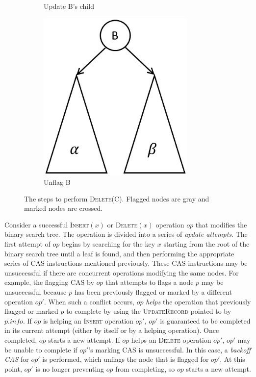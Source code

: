 \documentclass[letterpaper]{article}
\newcommand{\info}{\mathit{info}}
\begin{document}
\begin{figure}[!bt]
\begin{subfigure}[b]{0.2\textwidth}
		\caption{Update B's child}
	\end{subfigure}
	\qquad
	\begin{subfigure}[b]{0.2\textwidth}\centering
		\includegraphics[width=0.85\textwidth]{bst_del_5.png} 
		\caption{Unflag B}
	\end{subfigure}
	\caption{The steps to perform \textsc{Delete}(C). Flagged nodes are gray and marked nodes are crossed.}\label{fig_bst_delete}
\end{figure}

Consider a successful \textsc{Insert}$(x)$ or \textsc{Delete}$(x)$ operation $op$ that modifies the binary search tree. The operation is divided into a series of \textit{update attempts}. The first attempt of $op$ begins by searching for the key $x$ starting from the root of the binary search tree until a leaf is found, and then performing the appropriate series of CAS instructions mentioned previously. These CAS instructions may be unsuccessful if there are concurrent operations modifying the same nodes. For example, the flagging CAS by $op$ that attempts to flags a node $p$ may be unsuccessful because $p$ has been previously flagged or marked by a different operation $op'$. When such a conflict occurs, $op$ \textit{helps} the operation that previously flagged or marked $p$ to complete by using the \textsc{UpdateRecord} pointed to by $p.\info$. If $op$ is helping an \textsc{Insert} operation $op'$, $op'$ is guaranteed to be completed in its current attempt (either by itself or by a helping operation). Once completed, $op$ starts a new attempt. If $op$ helps an \textsc{Delete} operation $op'$, $op'$ may be unable to complete if $op'$'s marking CAS is unsuccessful. In this case, a \textit{backoff CAS} for $op'$ is performed, which unflags the node that is flagged for $op'$. At this point, $op'$ is no longer preventing $op$ from completing, so $op$ starts a new attempt.
\end{document}
